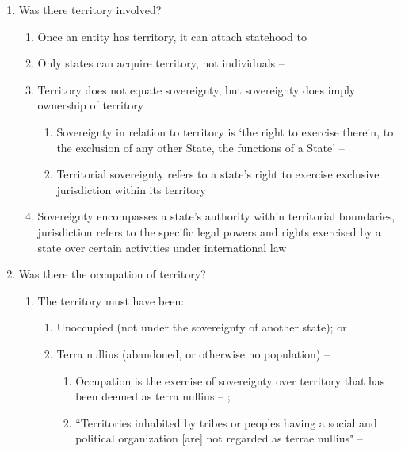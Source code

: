 \begin{enumerate}
    \item Was there territory involved?
    \begin{enumerate}
        \item Once an entity has territory, it can attach statehood to 
        \item Only states can acquire territory, not individuals -- 
        \item Territory does not equate sovereignty, but sovereignty does imply ownership of territory
        \begin{enumerate}
            \item Sovereignty in relation to territory is `the right to exercise therein, to the exclusion of any other State, the functions of a State' -- 
            \item Territorial sovereignty refers to a state's right to exercise exclusive jurisdiction within its territory
        \end{enumerate}
        \item Sovereignty encompasses a state's authority within territorial boundaries, jurisdiction refers to the specific legal powers and rights exercised by a state over certain activities under international law
    \end{enumerate}
    \item Was there the occupation of territory?
    \begin{enumerate}
        \item The territory must have been:
        \begin{enumerate}
            \item Unoccupied (not under the sovereignty of another state); or
            \item Terra nullius (abandoned, or otherwise no population) -- 
            \begin{enumerate}
                \item Occupation is the exercise of sovereignty over territory that has been deemed as terra nullius -- ; 
                \item ``Territories inhabited by tribes or peoples having a social and political organization [are] not regarded as terrae nullius" -- 

\end{enumerate}
\end{enumerate}
\end{enumerate}
\end{enumerate}

